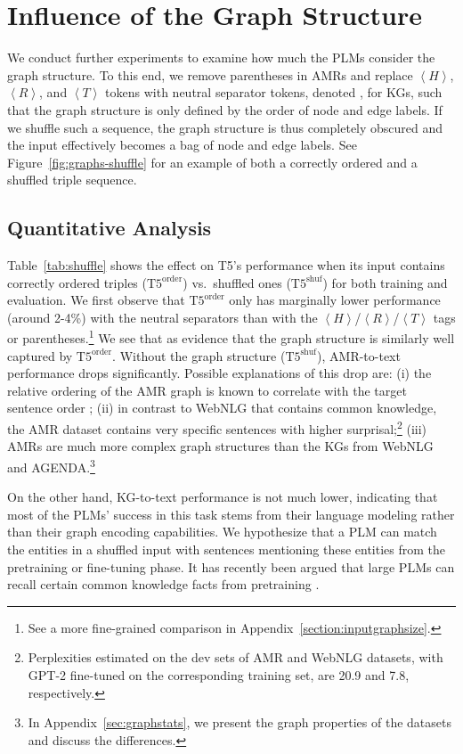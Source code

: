 \documentclass[11pt]{article}
\makeatletter
\newcommand{\ourtag}[1]{\ensuremath{\left\langle #1 \right\rangle}}
\newcommand{\shufmodel}[3]{\ensuremath{\text{#1}^{\text{#3}}}}
\newcommand*{\bigcdot}{}\DeclareRobustCommand*{\bigcdot}{\mathbin{\mathpalette\bigcdot@{}}}
\newcommand*{\bigcdot@scalefactor}{.65}
\newcommand*{\bigcdot@widthfactor}{1.15}
\newcommand*{\bigcdot@}[2]{\sbox0{$#1\vcenter{}$}\sbox2{$#1\cdot\m@th$}\hbox to \bigcdot@widthfactor\wd2{\hfil
    \raise\ht0\hbox{\scalebox{\bigcdot@scalefactor}{\lower\ht0\hbox{$#1\bullet\m@th$}}}\hfil
  }}
\newcommand{\sep}{$\bigcdot$}
\makeatother
\begin{document}
\section{Influence of the Graph Structure}


We conduct further experiments to examine how much the PLMs consider the graph structure.
To this end, we remove parentheses in AMRs and replace \ourtag{H}, \ourtag{R}, and \ourtag{T} tokens with neutral separator tokens, denoted \sep{}, for KGs, such that the graph structure is only defined by the order of node and edge labels.
If we shuffle such a sequence,
the graph structure is thus completely obscured and the input effectively becomes a bag of node and edge labels.
See Figure~\ref{fig:graphs-shuffle} for an example of both a correctly ordered and a shuffled triple sequence.


\subsection{Quantitative Analysis}

Table~\ref{tab:shuffle} shows the effect on T5's performance when its input contains correctly ordered triples (\shufmodel{T5}{small}{order}) vs.\ shuffled ones (\shufmodel{T5}{small}{shuf}) for both training and evaluation.
We first observe that \shufmodel{T5}{small}{order} only has marginally lower performance (around 2-4\%{}) with the neutral separators than with the \ourtag{H}/\ourtag{R}/\ourtag{T} tags or parentheses.\footnote{See a more fine-grained comparison in Appendix~\ref{section:inputgraphsize}.} We see that as evidence that the graph structure is similarly well captured by \shufmodel{T5}{small}{order}.
Without the graph structure (\shufmodel{T5}{small}{shuf}), AMR-to-text performance drops significantly. Possible explanations of this drop are: (i) the relative ordering of the AMR graph is known to correlate with the target sentence order \cite{konsas_17}; (ii) in contrast to WebNLG that contains common knowledge, the AMR dataset contains very specific sentences with higher surprisal;\footnote{Perplexities estimated on the dev sets of AMR and WebNLG datasets, with GPT-2 fine-tuned on the corresponding training set, are 20.9 and 7.8, respectively.} (iii) AMRs are much more complex graph structures than the KGs from WebNLG and AGENDA.\footnote{In Appendix~\ref{sec:graphstats}, we present the graph properties of the datasets and discuss the differences.}  

On the other hand, KG-to-text performance is not much lower,
indicating that most of the PLMs' success in this task stems from their language modeling rather than their graph encoding capabilities. 
We hypothesize that a PLM can match the entities in a shuffled input with sentences mentioning these entities from the pretraining or fine-tuning phase.
It has recently been argued that large PLMs can recall certain common knowledge facts from pretraining \citep{petroni-etal-2019-language,bosselut-etal-2019-comet}.
\end{document}
